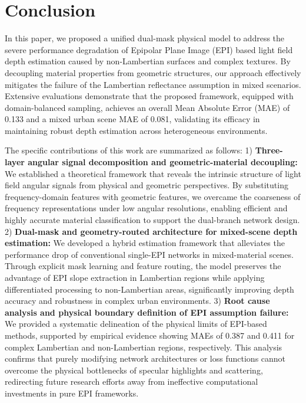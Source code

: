 \section{Conclusion}


In this paper, we proposed a unified dual-mask physical model to address the severe performance degradation of Epipolar Plane Image (EPI) based light field depth estimation caused by non-Lambertian surfaces and complex textures. By decoupling material properties from geometric structures, our approach effectively mitigates the failure of the Lambertian reflectance assumption in mixed scenarios. Extensive evaluations demonstrate that the proposed framework, equipped with domain-balanced sampling, achieves an overall Mean Absolute Error (MAE) of 0.133 and a mixed urban scene MAE of 0.081, validating its efficacy in maintaining robust depth estimation across heterogeneous environments.

The specific contributions of this work are summarized as follows:
1) \textbf{Three-layer angular signal decomposition and geometric-material decoupling:} We established a theoretical framework that reveals the intrinsic structure of light field angular signals from physical and geometric perspectives. By substituting frequency-domain features with geometric features, we overcame the coarseness of frequency representations under low angular resolutions, enabling efficient and highly accurate material classification to support the dual-branch network design.
2) \textbf{Dual-mask and geometry-routed architecture for mixed-scene depth estimation:} We developed a hybrid estimation framework that alleviates the performance drop of conventional single-EPI networks in mixed-material scenes. Through explicit mask learning and feature routing, the model preserves the advantage of EPI slope extraction in Lambertian regions while applying differentiated processing to non-Lambertian areas, significantly improving depth accuracy and robustness in complex urban environments.
3) \textbf{Root cause analysis and physical boundary definition of EPI assumption failure:} We provided a systematic delineation of the physical limits of EPI-based methods, supported by empirical evidence showing MAEs of 0.387 and 0.411 for complex Lambertian and non-Lambertian regions, respectively. This analysis confirms that purely modifying network architectures or loss functions cannot overcome the physical bottlenecks of specular highlights and scattering, redirecting future research efforts away from ineffective computational investments in pure EPI frameworks.

